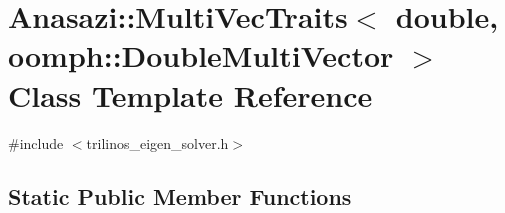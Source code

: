\hypertarget{classAnasazi_1_1MultiVecTraits_3_01double_00_01oomph_1_1DoubleMultiVector_01_4}{}\section{Anasazi\+:\+:Multi\+Vec\+Traits$<$ double, oomph\+:\+:Double\+Multi\+Vector $>$ Class Template Reference}
\label{classAnasazi_1_1MultiVecTraits_3_01double_00_01oomph_1_1DoubleMultiVector_01_4}


{\ttfamily \#include $<$trilinos\+\_\+eigen\+\_\+solver.\+h$>$}

\subsection*{Static Public Member Functions}

